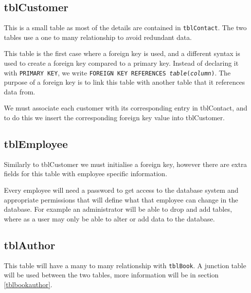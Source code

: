 \documentclass[11pt,a4paper]{scrartcl}
\begin{document}
	\subsection{tblCustomer}\label{tblcustomer}
	
	This is a small table as most of the details are contained in \texttt{tblContact}. The two tables use a one to many relationship to avoid redundant data.
	
	
	
	This table is the first case where a foreign key is used, and a different syntax is used to create a foreign key compared to a primary key. Instead of declaring it with \texttt{PRIMARY KEY}, we write \texttt{FOREIGN KEY REFERENCES \textit{table}(\textit{column})}. The purpose of a foreign key is to link this table with another table that it references data from.
	
	We must associate each customer with its corresponding entry in tblContact, and to do this we insert the corresponding foreign key value into tblCustomer.
	
	\subsection{tblEmployee}\label{tblemployee}
	
	Similarly to tblCustomer we must initialise a foreign key, however there are extra fields for this table with employee specific information.
	
	
	
	Every employee will need a password to get access to the database system and appropriate permissions that will define what that employee can change in the database. For example an administrator will be able to drop and add tables, where as a user may only be able to alter or add data to the database.
	
	\subsection{tblAuthor}\label{tblauthor}
	
	This table will have a many to many relationship with \texttt{tblBook}. A junction table will be used between the two tables, more information will be in section \ref{tblbookauthor}.
	
	
	
\end{document}
